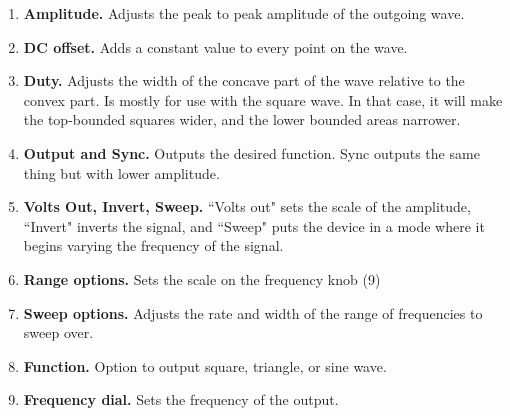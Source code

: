 \begin{enumerate}
\item \textbf{Amplitude.} Adjusts the peak to peak amplitude of the outgoing wave.
\item \textbf{DC offset.} Adds a constant value to every point on the wave.
\item \textbf{Duty.} Adjusts the width of the concave part of the wave relative to the convex part. Is mostly for use with the square wave. In that case, it will make the top-bounded squares wider, and the lower bounded areas narrower.
\item \textbf{Output and Sync.} Outputs the desired function. Sync outputs the same thing but with lower amplitude.
\item \textbf{Volts Out, Invert, Sweep.} ``Volts out" sets the scale of the amplitude, ``Invert" inverts the signal, and ``Sweep" puts the device in a mode where it begins varying the frequency of the signal.
\item \textbf{Range options.} Sets the scale on the frequency knob (9)
\item \textbf{Sweep options.} Adjusts the rate and width of the range of frequencies to sweep over.
\item \textbf{Function.} Option to output square, triangle, or sine wave.
\item \textbf{Frequency dial.} Sets the frequency of the output.
\end{enumerate}
